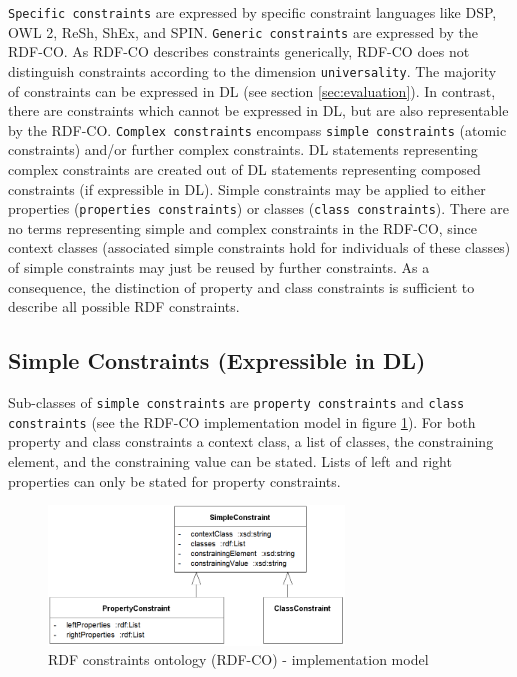 \documentclass{llncs}
\newcommand{\ms}[1]{\texttt{#1}}
\begin{document}
\ms{Specific constraints} are expressed by specific constraint languages like DSP, OWL 2, ReSh, ShEx, and SPIN.
\ms{Generic constraints} are expressed by the RDF-CO.
As RDF-CO describes constraints generically, RDF-CO does not distinguish constraints according to the dimension \ms{universality}. 
The majority of constraints can be expressed in DL (see section \ref{sec:evaluation}).
In contrast, there are constraints which cannot be expressed in DL, but are also representable by the RDF-CO. 
\ms{Complex constraints} encompass \ms{simple constraints} (atomic constraints) and/or further complex constraints.
DL statements representing complex constraints are created out of DL statements representing composed constraints (if expressible in DL). 
Simple constraints may be applied to either properties (\ms{properties constraints}) or classes (\ms{class constraints}).
There are no terms representing simple and complex constraints in the RDF-CO, since context classes (associated simple constraints hold for individuals of these classes) of simple constraints may just be reused by further constraints.
As a consequence, the distinction of property and class constraints is sufficient to describe all possible RDF constraints.

\subsection{Simple Constraints (Expressible in DL)}

Sub-classes of \ms{simple constraints} are \ms{property constraints} and \ms{class constraints} (see the RDF-CO implementation model in figure \ref{fig:RDF-CO-implementation-model}). 
For both property and class constraints a context class, a list of classes, the constraining element, and the constraining value can be stated. 
Lists of left and right properties can only be stated for property constraints.

\begin{figure}
	\centering
		\includegraphics[width=0.70\textwidth]{images/RDF-CO-implementation-model.png}
	\caption{RDF constraints ontology (RDF-CO) - implementation model}
	\label{fig:RDF-CO-implementation-model}
\end{figure}
\end{document}
